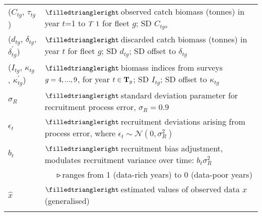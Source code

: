 \documentclass[11pt]{book}
\newcommand{\Norm}{\mathcal{N}}%
\newcommand{\mbull}{$\filledtriangleright$\,}
\newcommand{\nbull}{~~~$\smalltriangleright$\,}
\def\minus{%
  \setbox0=\hbox{-}%
  \vcenter{%
    \hrule width\wd0 height 0.05pt%
  }%
}
\begin{document}
\begin{longtable}{L{1.00in}L{5.5in}}
($C_{tg}$, $\tau_{tg}$) & \mbull observed catch biomass (tonnes) in year $t$=1 to $T\minus\text{1}$ for fleet $g$; SD $C_{tgs}$\\
($d_{tg}$, $\delta_{tg}$, $\delta_{tg}^\prime$)  & \mbull discarded catch biomass (tonnes) in year $t$ for fleet $g$; SD $d_{tg}$; SD offset to $\delta_{tg}$\\
($I_{tg}$, $\kappa_{tg}$, $\kappa_{tg}^\prime$)  & \mbull biomass indices from surveys $g = 4,...,9$, for year $t \in {\bf T}_g$; SD $I_{tg}$; SD offset to $\kappa_{tg}$\\
$\sigma_R$            & \mbull standard deviation parameter for recruitment process error, $\sigma_R = 0.9$\\
$\epsilon_t$          & \mbull recruitment deviations arising from process error, where $\epsilon_t \sim \Norm(0, \sigma_R^2)$\\
$b_t$                 & \mbull recruitment bias adjustment, modulates recruitment variance over time: $b_t\sigma_R^2$\\
                      & \nbull ranges from 1 (data-rich years) to 0 (data-poor years)\\
$\widehat{x}$       & \mbull estimated values of observed data $x$ (generalised)\\
\\[-.5ex]


\end{longtable}
\end{document}
